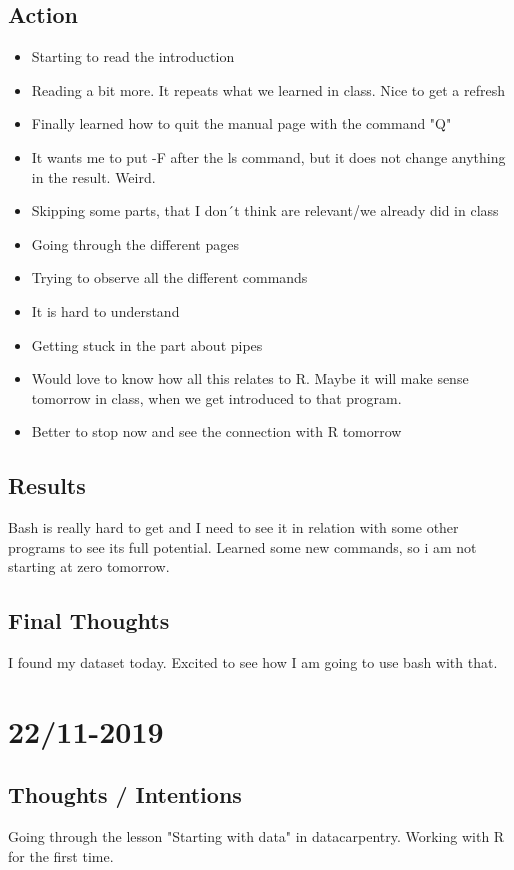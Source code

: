 \documentclass{article}
\begin{document}
\subsection{Action}
\begin{itemize}
    \item Starting to read the introduction 
    \item Reading a bit more. It repeats what we learned in class. Nice to get a refresh 
    \item Finally learned how to quit the manual page with the command "Q" 
    \item It wants me to put -F after the ls command, but it does not change anything in the result. Weird. 
    \item Skipping some parts, that I don´t think are relevant/we already did in class
    \item Going through the different pages 
    \item Trying to observe all the different commands 
    \item It is hard to understand 
    \item Getting stuck in the part about pipes 
    \item Would love to know how all this relates to R. Maybe it will make sense tomorrow in class, when we get introduced to that program. 
    \item Better to stop now and see the connection with R tomorrow
    \end{itemize}

\subsection{Results}
\text Bash is really hard to get and I need to see it in relation with some other programs to see its full potential. Learned some new commands, so i am not starting at zero tomorrow.  

\subsection{Final Thoughts}
\text I found my dataset today. Excited to see how I am going to use bash with that. 



\section{22/11-2019}
\subsection{Thoughts / Intentions}
\text Going through the lesson "Starting with data" in datacarpentry. Working with R for the first time. 
\end{document}
